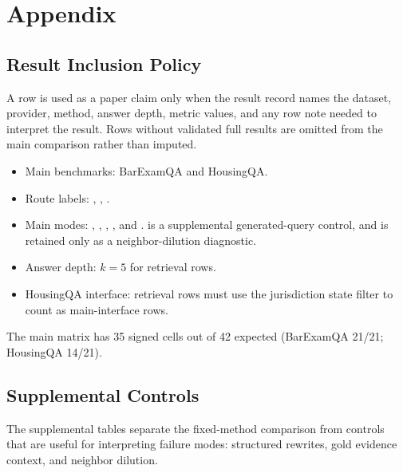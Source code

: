 \section{Appendix}\label{sec:appendix}

\subsection{Result Inclusion Policy}\label{sec:appendix:policy}

A row is used as a paper claim only when the result record names the dataset,
provider, method, answer depth, metric values, and any row note needed to
interpret the result. Rows without validated full results are omitted from the
main comparison rather than imputed.

\begin{itemize}[leftmargin=*]
\item Main benchmarks: BarExamQA and HousingQA.
\item Route labels: , ,
.
\item Main modes: , ,
, , and .
 is a supplemental generated-query control, and
 is retained only as a neighbor-dilution
diagnostic.
\item Answer depth: $k=5$ for retrieval rows.
\item HousingQA interface: retrieval rows must use the jurisdiction state
filter to count as main-interface rows.
\end{itemize}

The main matrix has 35 signed cells out of 42 expected (BarExamQA 21/21; HousingQA 14/21).

\FloatBarrier

\subsection{Supplemental Controls}\label{sec:appendix:additional}

The supplemental tables separate the fixed-method comparison from controls
that are useful for interpreting failure modes: structured rewrites,
gold evidence context, and neighbor dilution.






